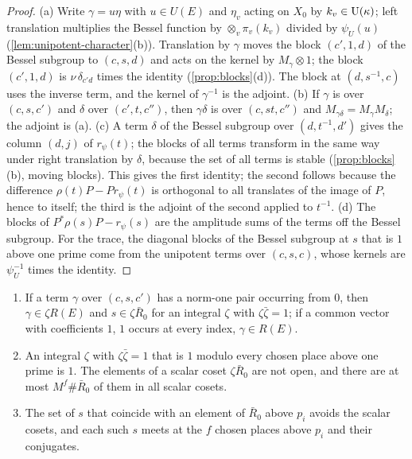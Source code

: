 \begin{proof}
(a) Write $\gamma=u\eta$ with $u\in U(E)$ and $\eta_v$ acting on $X_0$ by $k_v\in\operatorname{U}(\kappa)$; left translation multiplies the Bessel function by $\otimes_v\pi_v(k_v)$ divided by $\psi_U(u)$ (\cref{lem:unipotent-character}(b)). Translation by $\gamma$ moves the block $(c',1,d)$ of
the Bessel subgroup to $(c,s,d)$ and acts on the kernel by $M_\gamma\otimes1$; the block $(c',1,d)$ is $\nu\,\delta_{c'd}$ times the identity (\cref{prop:blocks}(d)). The block at $(d,s^{-1},c)$ uses the inverse term, and the kernel of $\gamma^{-1}$ is the adjoint.
(b) If $\gamma$ is over $(c,s,c')$ and $\delta$ over $(c',t,c'')$, then $\gamma\delta$ is over $(c,st,c'')$ and $M_{\gamma\delta}=M_\gamma M_\delta$; the adjoint is (a). (c) A term $\delta$ of the Bessel subgroup over $(d,t^{-1},d')$ gives the column $(d,j)$ of $r_\psi(t)$; the blocks of all terms
transform in the same way under right translation by $\delta$, because the set of all terms is stable (\cref{prop:blocks}(b), moving blocks). This gives the first identity; the second follows because the difference $\rho(t)P-Pr_\psi(t)$ is orthogonal to all translates of the image
of $P$, hence to itself; the third is the adjoint of the second applied to $t^{-1}$. (d) The blocks of $P^*\rho(s)P-r_\psi(s)$ are the amplitude sums of the terms off the Bessel subgroup. For the trace, the diagonal blocks of the Bessel subgroup at $s$ that is $1$ above one
prime come from the unipotent terms over $(c,s,c)$, whose kernels are $\psi_U^{-1}$ times the identity.
\end{proof}

\begin{lemma}\label{lem:scalar-cosets}
\begin{enumerate}[label=\textup{(\alph*)}]
\item If a term $\gamma$ over $(c,s,c')$ has a norm-one pair occurring from $0$, then $\gamma\in\zeta R(E)$ and $s\in\zeta\bar R_0$ for an integral $\zeta$ with $\zeta\bar\zeta=1$; if a common vector with coefficients $1$, $1$ occurs at every index, $\gamma\in R(E)$.
\item An integral $\zeta$ with $\zeta\bar\zeta=1$ that is $1$ modulo every chosen place above one prime is $1$. The elements of a scalar coset $\zeta\bar R_0$ are not open, and there are at most $M^f\#\bar R_0$ of them in all scalar cosets.
\item The set of $s$ that coincide with an element of $\bar R_0$ above $p_i$ avoids the scalar cosets, and each such $s$ meets at the $f$ chosen places above $p_i$ and their conjugates.
\end{enumerate}
\end{lemma}


